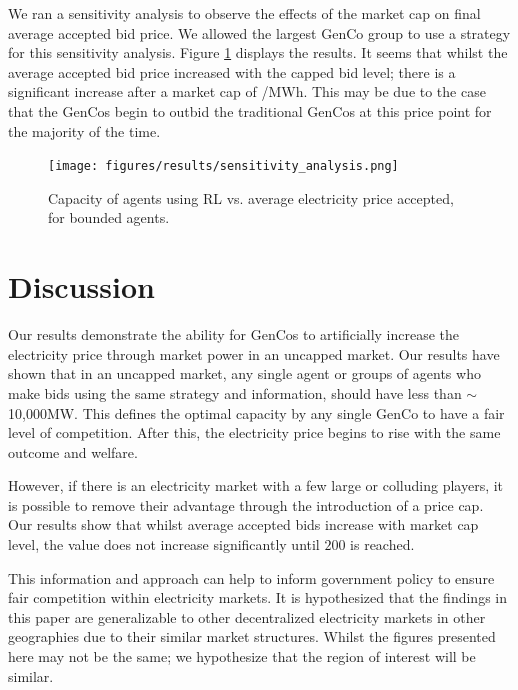 \documentclass[conference]{IEEEtran}
\begin{document}
We ran a sensitivity analysis to observe the effects of the market cap on final average accepted bid price. We allowed the largest GenCo group to use a strategy for this sensitivity analysis. Figure \ref{fig:sensitivity_analysis} displays the results. It seems that whilst the average accepted bid price increased with the capped bid level; there is a significant increase after a market cap of /MWh. This may be due to the case that the GenCos begin to outbid the traditional GenCos at this price point for the majority of the time. 

\begin{figure}
    \texttt{[image: figures/results/sensitivity\_analysis.png]}
    \caption{Capacity of agents using RL vs. average electricity price accepted, for bounded agents.}
    \label{fig:sensitivity_analysis}
\end{figure}






\section{Discussion}
\label{sec:discussion}

Our results demonstrate the ability for GenCos to artificially increase the electricity price through market power in an uncapped market. Our results have shown that in an uncapped market, any single agent or groups of agents who make bids using the same strategy and information, should have less than ${\sim}$10,000MW. This defines the optimal capacity by any single GenCo to have a fair level of competition. After this, the electricity price begins to rise with the same outcome and welfare.

However, if there is an electricity market with a few large or colluding players, it is possible to remove their advantage through the introduction of a price cap. Our results show that whilst average accepted bids increase with market cap level, the value does not increase significantly until \textsterling$200$ is reached.

This information and approach can help to inform government policy to ensure fair competition within electricity markets. It is hypothesized that the findings in this paper are generalizable to other decentralized electricity markets in other geographies due to their similar market structures. Whilst the figures presented here may not be the same; we hypothesize that the region of interest will be similar.
\end{document}
